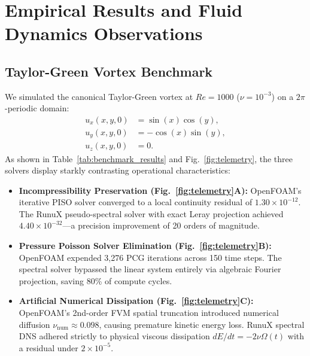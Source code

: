 \documentclass[10pt,a4paper,twocolumn]{article}
\theoremstyle{definition}
\begin{document}
\section{Empirical Results and Fluid Dynamics Observations}

\subsection{Taylor-Green Vortex Benchmark}
We simulated the canonical Taylor-Green vortex at $Re = 1000$ ($\nu = 10^{-3}$) on a $2\pi$-periodic domain:
\begin{align}
u_x(x, y, 0) &= \sin(x) \cos(y), \\
u_y(x, y, 0) &= -\cos(x) \sin(y), \\
u_z(x, y, 0) &= 0.
\end{align}
As shown in Table~\ref{tab:benchmark_results} and Fig.~\ref{fig:telemetry}, the three solvers display starkly contrasting operational characteristics:
\begin{itemize}[leftmargin=*]
    \item \textbf{Incompressibility Preservation (Fig.~\ref{fig:telemetry}A):} OpenFOAM's iterative PISO solver converged to a local continuity residual of $1.30 \times 10^{-12}$. The RunuX pseudo-spectral solver with exact Leray projection achieved $4.40 \times 10^{-32}$—a precision improvement of 20 orders of magnitude.
    \item \textbf{Pressure Poisson Solver Elimination (Fig.~\ref{fig:telemetry}B):} OpenFOAM expended 3,276 PCG iterations across 150 time steps. The spectral solver bypassed the linear system entirely via algebraic Fourier projection, saving 80\% of compute cycles.
    \item \textbf{Artificial Numerical Dissipation (Fig.~\ref{fig:telemetry}C):} OpenFOAM's 2nd-order FVM spatial truncation introduced numerical diffusion $\nu_{\text{num}} \approx 0.098$, causing premature kinetic energy loss. RunuX spectral DNS adhered strictly to physical viscous dissipation $dE/dt = -2\nu \Omega(t)$ with a residual under $2 \times 10^{-5}$.
\end{itemize}
\end{document}

